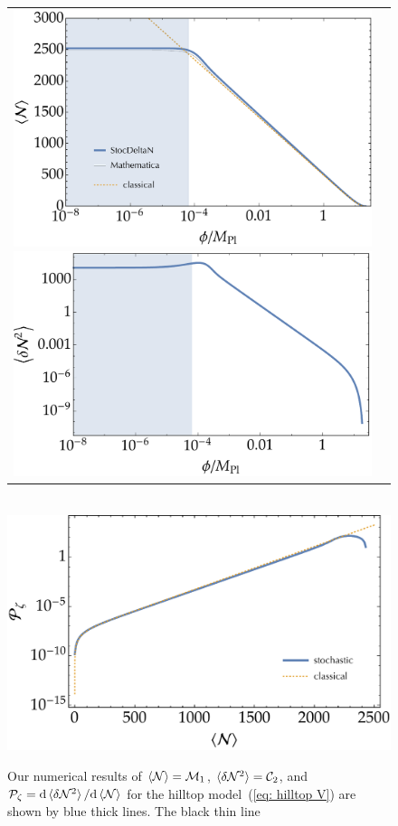 \documentclass[aps, prd
, preprint
, nofootinbib 
, longbibliography
]{revtex4-1}
\newcommand{\dd}{\mathrm{d}}
\newcommand{\calC}{\mathcal{C}}
\newcommand{\calM}{\mathcal{M}}
\newcommand{\calN}{\mathcal{N}}
\newcommand{\calP}{\mathcal{P}}
\begin{document}
\begin{figure}
	\centering
	\begin{tabular}{cc}
		\begin{minipage}{0.5\hsize}
			\centering
			\includegraphics[width=0.9\hsize]{figs/hilltop/N_conf.pdf}
		\end{minipage}
		\begin{minipage}{0.5\hsize}
			\centering
			\includegraphics[width=0.9\hsize]{figs/hilltop/dN2_conf.pdf}
		\end{minipage}
	\end{tabular} \\[10pt]
	\includegraphics[width=0.5\hsize]{figs/hilltop/Pzeta_conf.pdf}
	\caption{Our numerical results of $\braket{\calN}=\calM_1$, $\braket{\delta\calN^2}=\calC_2$, and $\calP_\zeta=\dd\braket{\delta\calN^2}/\dd\braket{\calN}$ 
	for the hilltop model~(\ref{eq: hilltop V}) are shown by blue thick lines. The black thin line}
	\label{figs: hilltop_conf}
\end{figure}
\end{document}
